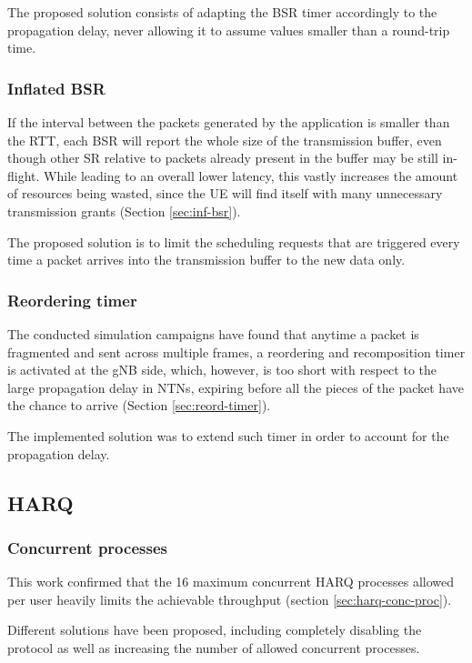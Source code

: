The proposed solution consists of adapting the \ac{BSR} timer accordingly to the propagation delay, never allowing it to assume values smaller than a round-trip time. 

\subsubsection{Inflated BSR}
If the interval between the packets generated by the application is smaller than the \ac{RTT}, each \ac{BSR} will report the whole size of the transmission buffer, even though other \ac{SR} relative to packets already present in the buffer may be still in-flight. While leading to an overall lower latency, this vastly increases the amount of resources being wasted, since the \ac{UE} will find itself with many unnecessary transmission grants (Section \ref{sec:inf-bsr}).

The proposed solution is to limit the scheduling requests that are triggered every time a packet arrives into the transmission buffer to the new data only.

\subsubsection{Reordering timer}
The conducted simulation campaigns have found that anytime a packet is fragmented and sent across multiple frames, a reordering and recomposition timer is activated at the \ac{gNB} side, which, however, is too short with respect to the large propagation delay in \ac{NTN}s, expiring before all the pieces of the packet have the chance to arrive (Section \ref{sec:reord-timer}).

The implemented solution was to extend such timer in order to account for the propagation delay.

\subsection{HARQ}
\subsubsection{Concurrent processes}
This work confirmed that the 16 maximum concurrent \ac{HARQ} processes allowed per user heavily limits the achievable throughput (section \ref{sec:harq-conc-proc}).

Different solutions have been proposed, including completely disabling the protocol as well as increasing the number of allowed concurrent processes.

